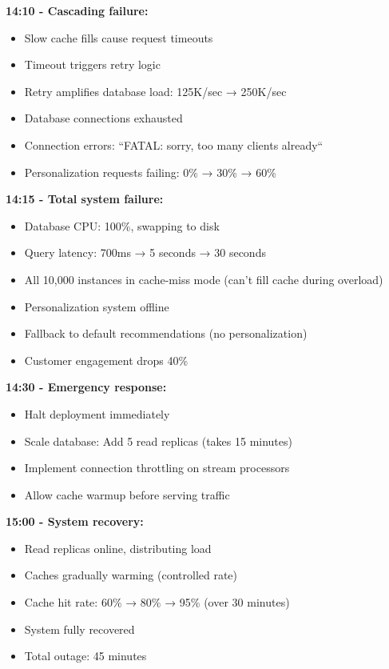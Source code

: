 \textbf{14:10 - Cascading failure:}
\begin{itemize}
    \item Slow cache fills cause request timeouts
    \item Timeout triggers retry logic
    \item Retry amplifies database load: 125K/sec → 250K/sec
    \item Database connections exhausted
    \item Connection errors: ``FATAL: sorry, too many clients already``
    \item Personalization requests failing: 0\% → 30\% → 60\%
\end{itemize}

\textbf{14:15 - Total system failure:}
\begin{itemize}
    \item Database CPU: 100\%, swapping to disk
    \item Query latency: 700ms → 5 seconds → 30 seconds
    \item All 10,000 instances in cache-miss mode (can't fill cache during overload)
    \item Personalization system offline
    \item Fallback to default recommendations (no personalization)
    \item Customer engagement drops 40\%
\end{itemize}

\textbf{14:30 - Emergency response:}
\begin{itemize}
    \item Halt deployment immediately
    \item Scale database: Add 5 read replicas (takes 15 minutes)
    \item Implement connection throttling on stream processors
    \item Allow cache warmup before serving traffic
\end{itemize}

\textbf{15:00 - System recovery:}
\begin{itemize}
    \item Read replicas online, distributing load
    \item Caches gradually warming (controlled rate)
    \item Cache hit rate: 60\% → 80\% → 95\% (over 30 minutes)
    \item System fully recovered
    \item Total outage: 45 minutes
\end{itemize}


